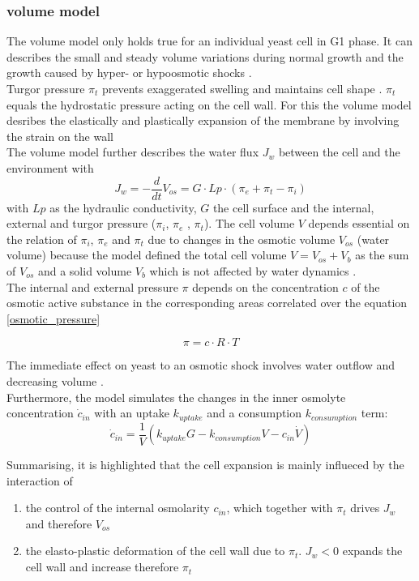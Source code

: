 \subsubsection{volume model}
The volume model only holds true for an individual yeast cell in G1 phase. It can describes the small and steady volume variations during normal growth and the growth caused by hyper- or hypoosmotic shocks \cite{volumeModel}.\\
Turgor pressure $\pi_t$ prevents exaggerated swelling and maintains cell shape \cite{volumeModel}. $\pi_t$ equals the hydrostatic pressure acting on the cell wall. For this the volume model desribes the elastically and plastically expansion of the membrane by involving the strain on the wall\\
The volume model further describes the water flux $J_w$ between the cell and the environment with 
\begin{equation}\label{waterFlux}
	J_{w} = - \frac{d}{dt} V_{os} = G \cdot Lp \cdot (\pi_e + \pi_t - \pi_i)
\end{equation}
with $Lp$ as the hydraulic conductivity, $G$ the cell surface and the internal, external and turgor pressure  ($\pi_i$, $\pi_e$ , $\pi_t$). 
The cell volume $V$ depends essential on the relation of $\pi_i$, $\pi_e$ and $\pi_t$ due to changes in the osmotic volume $V_{os}$ (water volume) because the model defined the total cell volume $V = V_{os} + V_b$ as the sum of $V_{os}$ and a solid volume $V_b$ which is not affected by water dynamics \cite{volumeModel}. \\ 
The internal and external pressure $\pi$ depends on the concentration $c$ of the osmotic active substance in the corresponding areas correlated over the equation \ref{osmotic_pressure}

\begin{equation} \label{osmotic_pressure}
	\pi = c \cdot R \cdot T	
\end{equation} 

The immediate effect on yeast to an osmotic shock involves water outflow and decreasing volume \cite{ASimpleMathematicalModel}.\\ 
Furthermore, the model simulates the changes in the inner osmolyte concentration $\dot c_{in}$ with an uptake $k_{uptake}$ and a consumption $k_{consumption}$ term:
\begin{equation*}
	\dot c_{in} = \frac{1}{V}(k_{uptake}G - k_{consumption}V-c_{in} \dot V)
\end{equation*}

Summarising, it is highlighted that the cell expansion is mainly influeced by the interaction of
\begin{enumerate}
	\item the control of the internal osmolarity $c_{in}$, which together with $\pi_t$ drives $J_w$ and therefore $V_{os}$
	\item the elasto-plastic deformation of the cell wall due to $\pi_t$. $J_w < 0$ expands the cell wall and increase therefore $\pi_t$
\end{enumerate}

